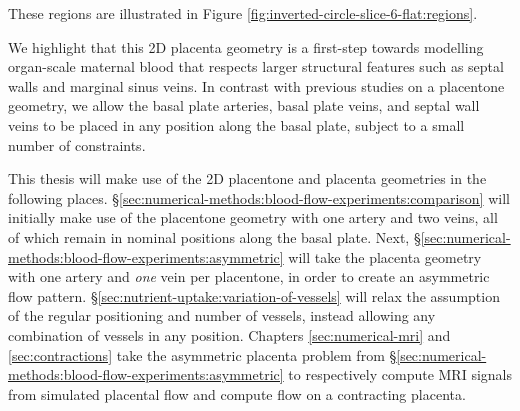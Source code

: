 These regions are illustrated in Figure \ref{fig:inverted-circle-slice-6-flat:regions}.

            We highlight that this 2D placenta geometry is a first-step towards modelling organ-scale maternal blood that respects larger structural features such as septal walls and marginal sinus veins. In contrast with previous studies on a placentone geometry, we allow the basal plate arteries, basal plate veins, and septal wall veins to be placed in any position along the basal plate, subject to a small number of constraints.

            This thesis will make use of the 2D placentone and placenta geometries in the following places. \S\ref{sec:numerical-methods:blood-flow-experiments:comparison} will initially make use of the placentone geometry with one artery and two veins, all of which remain in nominal positions along the basal plate. Next, \S\ref{sec:numerical-methods:blood-flow-experiments:asymmetric} will take the placenta geometry with one artery and \textit{one} vein per placentone, in order to create an asymmetric flow pattern. \S\ref{sec:nutrient-uptake:variation-of-vessels} will relax the assumption of the regular positioning and number of vessels, instead allowing any combination of vessels in any position. Chapters \ref{sec:numerical-mri} and \ref{sec:contractions} take the asymmetric placenta problem from \S\ref{sec:numerical-methods:blood-flow-experiments:asymmetric} to respectively compute MRI signals from simulated placental flow and compute flow on a contracting placenta.

